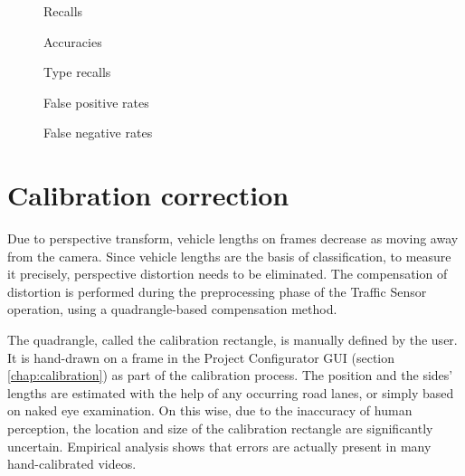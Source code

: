 \begin{figure}[p]
	\centering
	\caption[Test results: recalls]{Recalls \label{chart:recalls}}
\end{figure}

\begin{figure}[p]
	\centering
	\caption[Test results: accuracies]{Accuracies \label{chart:accuracies}}
\end{figure}

\begin{figure}[p]
	\centering
	\caption[Test results: type recalls]{Type recalls \label{chart:type_recalls}}
\end{figure}

\begin{figure}[p]
	\centering
	\caption[Test results: false positive rates]{False positive rates \label{chart:false_positives}}
\end{figure}

\begin{figure}[p]
	\centering
	\caption[Test results: false negative rates]{False negative rates \label{chart:false_negatives}}
\end{figure}

\FloatBarrier
\section{Calibration correction}\label{chap:cal_corr}
Due to perspective transform, vehicle lengths on frames decrease as moving away from the camera.
Since vehicle lengths are the basis of classification, to measure it precisely, perspective distortion needs to be eliminated.
The compensation of distortion is performed during the preprocessing phase of the Traffic Sensor operation, using a quadrangle-based compensation method.

The quadrangle, called the calibration rectangle, is manually defined by the user.
It is hand-drawn on a frame in the Project Configurator GUI (section \ref{chap:calibration}) as part of the calibration process.
The position and the sides' lengths are estimated with the help of any occurring road lanes, or simply based on naked eye examination.
On this wise, due to the inaccuracy of human perception, the location and size of the calibration rectangle are significantly uncertain.
Empirical analysis shows that errors are actually present in many hand-calibrated videos.

